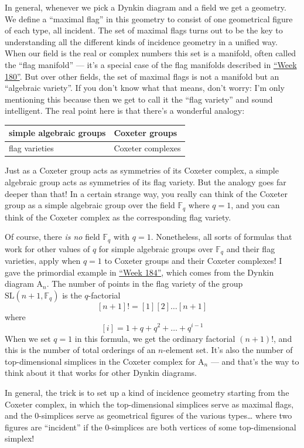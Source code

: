 \documentclass{article}
\begin{document}
In general, whenever we pick a Dynkin diagram and a field we get a
geometry. We define a ``maximal flag'' in this geometry to consist of
one geometrical figure of each type, all incident. The set of maximal
flags turns out to be the key to understanding all the different kinds
of incidence geometry in a unified way. When our field is the real or
complex numbers this set is a manifold, often called the ``flag
manifold'' --- it's a special case of the flag manifolds described in
\protect\hyperlink{week180}{``Week 180''}. But over other fields, the
set of maximal flags is not a manifold but an ``algebraic variety''. If
you don't know what that means, don't worry: I'm only mentioning this
because then we get to call it the ``flag variety'' and sound
intelligent. The real point here is that there's a wonderful analogy:

\begin{longtable}[]{@{}ll@{}}
\toprule
simple algebraic groups & Coxeter groups\tabularnewline
\midrule
\endhead
flag varieties & Coxeter complexes\tabularnewline
\bottomrule
\end{longtable}

Just as a Coxeter group acts as symmetries of its Coxeter complex, a
simple algebraic group acts as symmetries of its flag variety. But the
analogy goes far deeper than that! In a certain strange way, you really
can think of the Coxeter group as a simple algebraic group over the
field \(\mathbb{F}_q\) where \(q = 1\), and you can think of the Coxeter
complex as the corresponding flag variety.

Of course, there \emph{is no} field \(\mathbb{F}_q\) with \(q = 1\).
Nonetheless, all sorts of formulas that work for other values of \(q\)
for simple algebraic groups over \(\mathbb{F}_q\) and their flag
varieties, apply when \(q = 1\) to Coxeter groups and their Coxeter
complexes! I gave the primordial example in
\protect\hyperlink{week184}{``Week 184''}, which comes from the Dynkin
diagram \(\mathrm{A}_n\). The number of points in the flag variety of
the group \(\mathrm{SL}(n+1,\mathbb{F}_q)\) is the \(q\)-factorial
\[[n+1]! = [1] [2] \ldots [n+1]\] where
\[[i] = 1 + q + q^2 + \ldots + q^{i-1}\] When we set \(q = 1\) in this
formula, we get the ordinary factorial \((n+1)!\), and this is the
number of total orderings of an \(n\)-element set. It's also the number
of top-dimensional simplices in the Coxeter complex for \(\mathrm{A}_n\)
--- and that's the way to think about it that works for other Dynkin
diagrams.

In general, the trick is to set up a kind of incidence geometry starting
from the Coxeter complex, in which the top-dimensional simplices serve
as maximal flags, and the \(0\)-simplices serve as geometrical figures
of the various types\ldots{} where two figures are ``incident'' if the
\(0\)-simplices are both vertices of some top-dimensional simplex!
\end{document}
